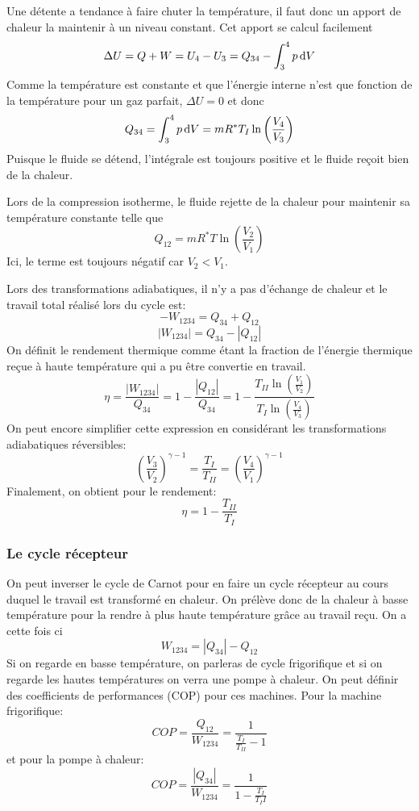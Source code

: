 Une détente a tendance à faire chuter la température,
il faut donc un apport de chaleur la maintenir à un niveau constant.
Cet apport se calcul facilement
\[ \Delta U = Q + W = U_4-U_3 = Q_{34} - \int_3^4 p\operatorname{d}\! V \]
Comme la température est constante et que l'énergie interne n'est que
fonction de la température pour un gaz parfait, $\Delta U = 0$ et donc
\[ Q_{34} = \int_3^4 p\operatorname{d}\! V = mR^*T_I \ln \left(\frac{V_4}{V_3} \right) \]
Puisque le fluide se détend,
l'intégrale est toujours positive et le fluide reçoit bien de la chaleur.

Lors de la compression isotherme, le fluide rejette de la chaleur pour
maintenir sa température constante telle que
\[ Q_{12} = mR^*T \ln \left(\frac{V_2}{V_1} \right) \]
Ici, le terme est toujours négatif car $V_2 < V_1$.

Lors des transformations adiabatiques,
il n'y a pas d'échange de chaleur et le travail total réalisé lors du cycle est:
\[ -W_{1234} = Q_{34} + Q_{12} \]
\[ |W_{1234}| = Q_{34}-|Q_{12}| \]
On définit le rendement thermique comme étant la fraction de l'énergie
thermique reçue à haute température qui a pu être convertie en travail.
\[ \eta = \frac {|W_{1234}|}{Q_{34}} = 1-\frac {|Q_{12}|}{Q_{34}} =
1-\frac{T_{II} \ln \left(\frac{V_1}{V_2}\right)}{T_I
\ln \left(\frac{V_4}{V_3} \right)} \]
On peut encore simplifier cette expression en considérant
les transformations adiabatiques réversibles:
\[ \left(\frac{V_3}{V_2}\right)^{\gamma -1} =
\frac {T_I}{T_{II}} = \left(\frac{V_4}{V_1} \right)^{\gamma -1} \]
Finalement, on obtient pour le rendement:
\[  \eta = 1 -\frac{T_{II}}{T_I} \]

\subsubsection{Le cycle récepteur}
On peut inverser le cycle de Carnot pour en faire
un cycle récepteur au cours duquel le travail est transformé en chaleur.
On prélève donc de la chaleur à basse température pour
la rendre à plus haute température grâce au travail reçu.
On a cette fois ci
\[ W_{1234} = |Q_{34}|-Q_{12} \]
Si on regarde en basse température, on parleras de cycle frigorifique et
si on regarde les hautes températures on verra une pompe à chaleur.
On peut définir des coefficients de performances (COP) pour ces machines.
Pour la machine frigorifique:
\[  COP =  \frac {Q_{12}}{W_{1234}} = \frac{1}{\frac{T_I}{T_{II}} -1} \]
et pour la pompe à chaleur:
\[  COP = \frac{|Q_{34}|}{W_{1234}} = \frac {1} {1-\frac{T_I}{T_II}} \]

